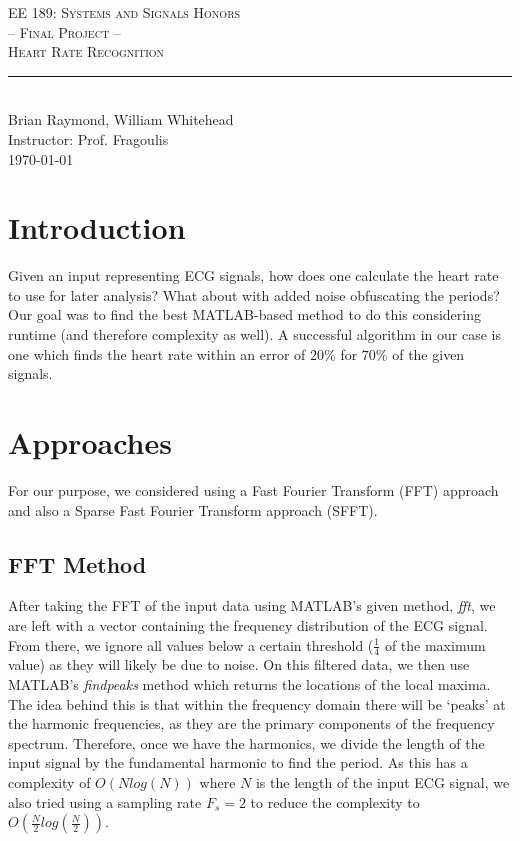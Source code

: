 \documentclass[twocolumn]{article}
\newcommand{\rpm}{\raisebox{.2ex}{$\scriptstyle\pm$}}
\newcommand{\classname}{EE 189: Systems and Signals Honors}
\newcommand{\project}{-- Final Project -- \\ Heart Rate Recognition}
\newcommand{\authorname}{Brian Raymond, William Whitehead}
\newcommand{\instructor}{Prof. Fragoulis}
\begin{document}
		
	\begin{center}
		{\large \textsc{\classname \\ \project} \\ \vspace{4pt}}
		\rule[13pt]{\columnwidth}{1pt} \\ %
		{\authorname \\ \vspace{2pt}
			Instructor: \instructor \\ \vspace{2pt}
			\today \\
		}
	\end{center}	
	
	\begin{flushleft}

		\section{Introduction}
		Given an input representing ECG signals, how does one calculate the heart rate to use for later analysis? What about with added noise obfuscating the periods? Our goal was to find the best MATLAB-based method to do this considering runtime (and therefore complexity as well). A successful algorithm in our case is one which finds the heart rate within an error of \rpm$20\%$ for $70\%$ of the given signals. \\ \vspace{-1em}
		
		\section{Approaches}
		For our purpose, we considered using a Fast Fourier Transform (FFT) approach and also a Sparse Fast Fourier Transform approach (SFFT). \\ \vspace{-2em}
		
		\hspace{2em}\subsection{FFT Method}
		After taking the FFT of the input data using MATLAB's given method, \textit{fft}, we are left with a vector containing the frequency distribution of the ECG signal. From there, we ignore all values below a certain threshold ($\frac{1}{4}$ of the maximum value) as they will likely be due to noise. On this filtered data, we then use MATLAB's \textit{findpeaks} method which returns the locations of the local maxima. The idea behind this is that within the frequency domain there will be `peaks' at the harmonic frequencies, as they are the primary components of the frequency spectrum. Therefore, once we have the harmonics, we divide the length of the input signal by the fundamental harmonic to find the period. As this has a complexity of $O(Nlog(N))$ where $N$ is the length of the input ECG signal, we also tried using a sampling rate $F_{s}=2$ to reduce the complexity to $O(\frac{N}{2}log(\frac{N}{2}))$. \\ \vspace{-2em}
		

\end{flushleft}
\end{document}
